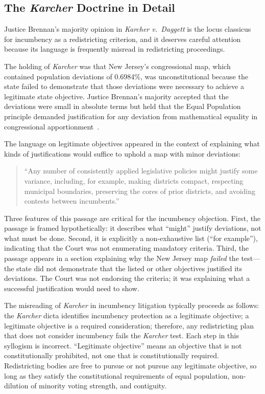 \label{sec:methodology}

\subsection{The \textit{Karcher} Doctrine in Detail}

Justice Brennan's majority opinion in \textit{Karcher v.\ Daggett} is the locus
classicus for incumbency as a redistricting criterion, and it deserves careful attention
because its language is frequently misread in redistricting proceedings.

The holding of \textit{Karcher} was that New Jersey's congressional map, which contained
population deviations of 0.6984\%, was unconstitutional because the state failed to
demonstrate that those deviations were necessary to achieve a legitimate state objective.
Justice Brennan's majority accepted that the deviations were small in absolute terms
but held that the Equal Population principle demanded justification for any deviation
from mathematical equality in congressional apportionment~\citep{karcher1983}.

The language on legitimate objectives appeared in the context of explaining what kinds
of justifications would suffice to uphold a map with minor deviations:

\begin{quote}
``Any number of consistently applied legislative policies might justify some
variance, including, for example, making districts compact, respecting municipal
boundaries, preserving the cores of prior districts, and avoiding contests between
incumbents.''
\end{quote}

Three features of this passage are critical for the incumbency objection. First, the
passage is framed hypothetically: it describes what ``might'' justify deviations, not
what must be done. Second, it is explicitly a non-exhaustive list (``for example''),
indicating that the Court was not enumerating mandatory criteria. Third, the passage
appears in a section explaining why the New Jersey map \textit{failed} the test---the
state did not demonstrate that the listed or other objectives justified its deviations.
The Court was not endorsing the criteria; it was explaining what a successful justification
would need to show.

The misreading of \textit{Karcher} in incumbency litigation typically proceeds as follows:
the \textit{Karcher} dicta identifies incumbency protection as a legitimate objective;
a legitimate objective is a required consideration; therefore, any redistricting plan
that does not consider incumbency fails the \textit{Karcher} test. Each step in this
syllogism is incorrect. ``Legitimate objective'' means an objective that is not
constitutionally prohibited, not one that is constitutionally required. Redistricting
bodies are free to pursue or not pursue any legitimate objective, so long as they
satisfy the constitutional requirements of equal population, non-dilution of minority
voting strength, and contiguity.

